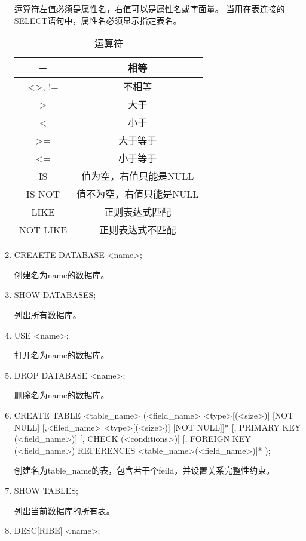 \begin{enumerate}
    运算符左值必须是属性名，右值可以是属性名或字面量。%
    当用在表连接的SELECT语句中，属性名必须显示指定表名。
    
    \begin{table}[!hbp]
        \centering
        \caption{运算符}
        \begin{tabular}{|c|c|}
        \hline
        = & 相等 \\
        \hline
        <>, != & 不相等 \\
        \hline
        > & 大于 \\
        \hline
        < & 小于 \\
        \hline
        >= & 大于等于 \\
        \hline
        <= & 小于等于 \\
        \hline
        IS & 值为空，右值只能是NULL \\
        \hline
        IS NOT & 值不为空，右值只能是NULL \\
        \hline
        LIKE & 正则表达式匹配 \\
        \hline
        NOT LIKE &  正则表达式不匹配 \\
        \hline
        \end{tabular}
    \end{table}
    \item
    CREAETE DATABASE <name>;

    创建名为name的数据库。
    \item
    SHOW DATABASES;

    列出所有数据库。
    \item
    USE <name>;

    打开名为name的数据库。
    \item
    DROP DATABASE <name>;

    删除名为name的数据库。
    \item
    CREATE TABLE <table\_name> (<field\_name> <type>[(<size>)] [NOT NULL] 
                         [,<filed\_name> <type>[(<size>)] [NOT NULL]]* 
                         [, PRIMARY KEY (<field\_name>)]
                         [, CHECK (<conditions>)]
                         [, FOREIGN KEY (<field\_name>) REFERENCES <table\_name>(<field\_name>)]*
                         );

    创建名为table\_name的表，包含若干个feild，并设置关系完整性约束。
    \item
    SHOW TABLES;

    列出当前数据库的所有表。
    \item
    DESC[RIBE] <name>;
    

\end{enumerate}
